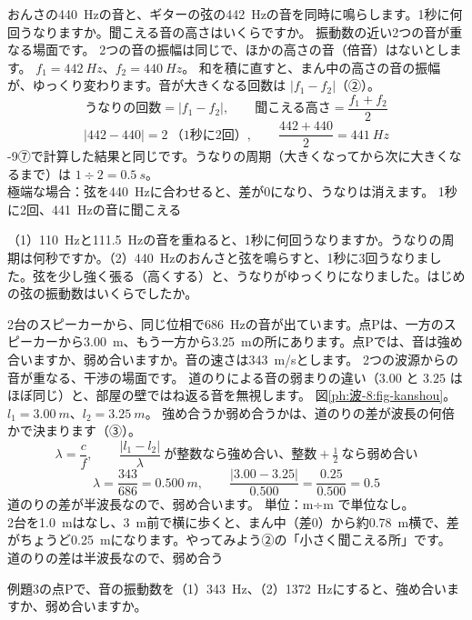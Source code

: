 \label{ph:波-8:ex2}
\begin{phreidai}[チューニングのうなり]
おんさの\qty{440}{Hz}の音と、ギターの弦の\qty{442}{Hz}の音を同時に鳴らします。1秒に何回うなりますか。聞こえる音の高さはいくらですか。
\phbamen
振動数の近い2つの音が重なる場面です。
\phmushi
2つの音の振幅は同じで、ほかの高さの音（倍音）はないとします。
\phzu
$f_1=\qty{442}{Hz}$、$f_2=\qty{440}{Hz}$。
\phriyu
和を積に直すと、まん中の高さの音の振幅が、ゆっくり変わります。音が大きくなる回数は $|f_1-f_2|$（②）。
\phtateru
\[\text{うなりの回数}=|f_1-f_2|,\qquad\text{聞こえる高さ}=\frac{f_1+f_2}{2}\]
\phtoku
\[|442-440|=2\ \text{（1秒に2回）},\qquad\frac{442+440}{2}=\qty{441}{Hz}\]
-9⑦で計算した結果と同じです。うなりの周期（大きくなってから次に大きくなるまで）は $1\div2=\qty{0.5}{s}$。\\
極端な場合：弦を\qty{440}{Hz}に合わせると、差が0になり、うなりは消えます。
\kotae 1秒に2回、\qty{441}{Hz}の音に聞こえる
\end{phreidai}
\begin{jibun}
（1）\qty{110}{Hz}と\qty{111.5}{Hz}の音を重ねると、1秒に何回うなりますか。うなりの周期は何秒ですか。（2）\qty{440}{Hz}のおんさと弦を鳴らすと、1秒に3回うなりました。弦を少し強く張る（高くする）と、うなりがゆっくりになりました。はじめの弦の振動数はいくらでしたか。
\end{jibun}

\label{ph:波-8:ex3}
\begin{phreidai}[2台のスピーカー]
2台のスピーカーから、同じ位相で\qty{686}{Hz}の音が出ています。点Pは、一方のスピーカーから\qty{3.00}{m}、もう一方から\qty{3.25}{m}の所にあります。点Pでは、音は強め合いますか、弱め合いますか。音の速さは\qty{343}{m/s}とします。
\phbamen
2つの波源からの音が重なる、干渉の場面です。
\phmushi
道のりによる音の弱まりの違い（$3.00$ と $3.25$ はほぼ同じ）と、部屋の壁ではね返る音を無視します。
\phzu
図\ref{ph:波-8:fig-kanshou}。$l_1=\qty{3.00}{m}$、$l_2=\qty{3.25}{m}$。
\phriyu
強め合うか弱め合うかは、道のりの差が波長の何倍かで決まります（③）。
\phtateru
\[\lambda=\frac{c}{f},\qquad\frac{|l_1-l_2|}{\lambda}\ \text{が整数なら強め合い、整数}+\tfrac12\ \text{なら弱め合い}\]
\phtoku
\[\lambda=\frac{343}{686}=\qty{0.500}{m},\qquad\frac{|3.00-3.25|}{0.500}=\frac{0.25}{0.500}=0.5\]
道のりの差が半波長なので、弱め合います。
\phtashikame
単位：m÷m で単位なし。\\
2台を\qty{1.0}{m}はなし、\qty{3}{m}前で横に歩くと、まん中（差0）から約\qty{0.78}{m}横で、差がちょうど\qty{0.25}{m}になります。やってみよう②の「小さく聞こえる所」です。
\kotae 道のりの差は半波長なので、弱め合う
\end{phreidai}
\begin{jibun}
例題3の点Pで、音の振動数を（1）\qty{343}{Hz}、（2）\qty{1372}{Hz}にすると、強め合いますか、弱め合いますか。
\end{jibun}

